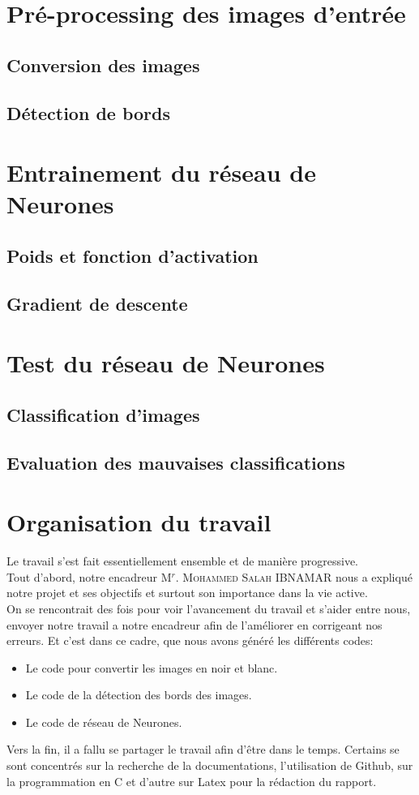 \documentclass[a4paper,12pt]{report}
\begin{document}
\chapter{Pré-processing des images d'entrée}
\section{Conversion des images}
\section{Détection de bords}

\chapter{Entrainement du réseau de Neurones}
\section{Poids et fonction d'activation}
\section{Gradient de descente}

\chapter{Test du réseau de Neurones}
\section{Classification d'images}
\section{Evaluation des mauvaises classifications}

\chapter{Organisation du travail}
Le travail s’est fait essentiellement ensemble et de manière progressive.\\
Tout d’abord, notre encadreur M$^{r}$. \textsc{Mohammed Salah} IBNAMAR  nous a expliqué notre projet et ses objectifs et surtout son importance dans la vie active.\\
On se rencontrait des fois pour voir l'avancement  du travail et s'aider entre nous, envoyer notre travail a notre encadreur afin de l'améliorer en corrigeant nos erreurs. Et c'est dans ce cadre, que nous avons généré les différents codes:
\begin{itemize}
      \item [\star] Le code pour convertir les images en noir et blanc.
      \item [\star] Le code de la détection des bords des images.
      \item [\star] Le code de réseau de Neurones.
    \end{itemize}
Vers la fin, il a fallu se partager le travail afin d’être dans le temps. Certains se sont concentrés sur la recherche de la documentations, l'utilisation de Github, sur la programmation en C et d’autre sur Latex pour la rédaction du rapport.
\end{document}

